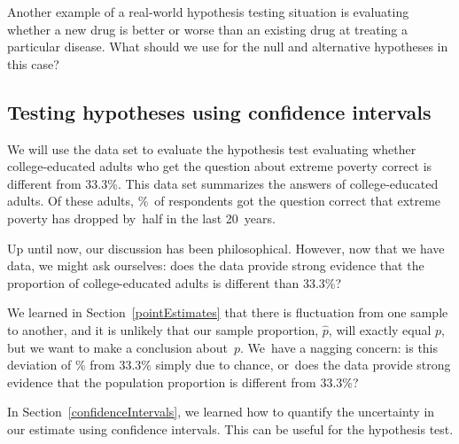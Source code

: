 \begin{exercisewrap}
\begin{nexercise}
  Another example of a real-world hypothesis testing situation
  is evaluating whether a new drug is better or worse
  than an existing drug at treating a particular disease.
  What should we use for the null and alternative hypotheses in
  this case?\footnotemark
\end{nexercise}
\end{exercisewrap}


\subsection{Testing hypotheses using confidence intervals}
\label{utilizingOurCI}


We will use the  data set to evaluate
the hypothesis test evaluating whether college-educated adults
who get the question about extreme poverty correct is different
from 33.3\%.
This data set summarizes the answers of \roslingAsize{}
college-educated adults.
Of these \roslingAsize{} adults, \roslingApercent{}\%~of
respondents got the question correct that extreme poverty
has dropped by~half in the last 20~years.

Up until now, our discussion has been philosophical.
However, now that we have data, we might ask ourselves:
does the data provide strong evidence that the proportion
of college-educated adults is different than 33.3\%?

We learned in Section~\ref{pointEstimates} that there is
fluctuation from one sample to another, and it is unlikely
that our sample proportion, $\hat{p}$,
will exactly equal $p$, but we want to make
a conclusion about~$p$.
We~have a nagging concern:
is this deviation of \roslingApercent{}\%
from 33.3\% simply due to chance,
or~does the data provide strong evidence that the
population proportion is different from 33.3\%?

In Section~\ref{confidenceIntervals}, we learned how to
quantify the uncertainty in our estimate using confidence
intervals. This can be useful for the hypothesis test.

